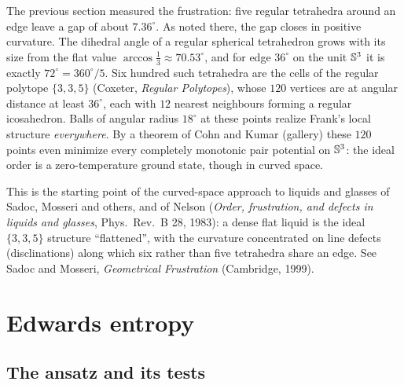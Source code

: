 The previous section measured the frustration: five regular tetrahedra around an edge leave a gap of
about $7.36^\circ$. As noted there, the gap closes in positive curvature. The dihedral angle of a regular
spherical tetrahedron grows with its size from the flat value $\arccos\frac13\approx70.53^\circ$, and for
edge $36^\circ$ on the unit $\mathbb{S}^3$ it is exactly $72^\circ=360^\circ/5$. Six hundred such tetrahedra are the cells of the
regular polytope $\{3,3,5\}$ (Coxeter, \emph{Regular Polytopes}), whose $120$ vertices are at angular
distance at least $36^\circ$, each with $12$ nearest neighbours forming a regular icosahedron. Balls of
angular radius $18^\circ$ at these points realize Frank's local structure \emph{everywhere}. By a theorem of
Cohn and Kumar (gallery) these $120$ points even minimize every completely monotonic pair potential on
$\mathbb{S}^3$: the ideal order is a zero-temperature ground state, though in curved space.

This is the starting point of the curved-space approach to liquids and glasses of Sadoc, Mosseri and
others, and of Nelson (\emph{Order, frustration, and defects in liquids and glasses}, Phys.\ Rev.~B 28,
1983): a dense flat liquid is the ideal $\{3,3,5\}$ structure ``flattened'', with the curvature
concentrated on line defects (disclinations) along which six rather than five tetrahedra share an edge.
See Sadoc and Mosseri, \emph{Geometrical Frustration} (Cambridge, 1999).

\section{Edwards entropy}
\label{SM:sec:edwards}

\subsection{The ansatz and its tests}

